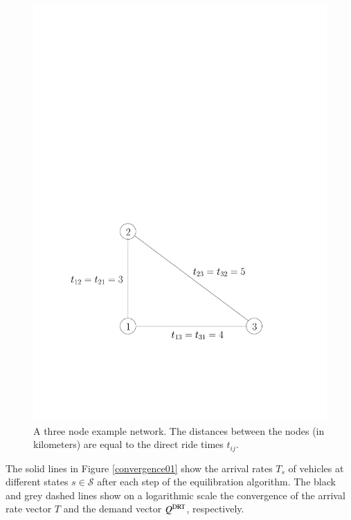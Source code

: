 \documentclass[dissertation,draft*]{aaltoseries}
\begin{document}
\begin{figure}[ht]
\begin{center}
\includegraphics[width=0.4\columnwidth]{3node01}
\caption{A three node example network. The distances between the nodes 
(in kilometers) are equal to the direct ride times $t_{ij}$.}
\label{3node01}
\end{center}
\end{figure}

The solid lines in Figure \ref{convergence01} show the
arrival rates $T_s$ of vehicles at different states $s \in \mathcal{S}$ after each step of the equilibration algorithm. 
The black and grey dashed lines show on a logarithmic scale 
the convergence of the arrival rate vector $T$ and the demand vector $Q^{\rm DRT}$, respectively.
\end{document}

